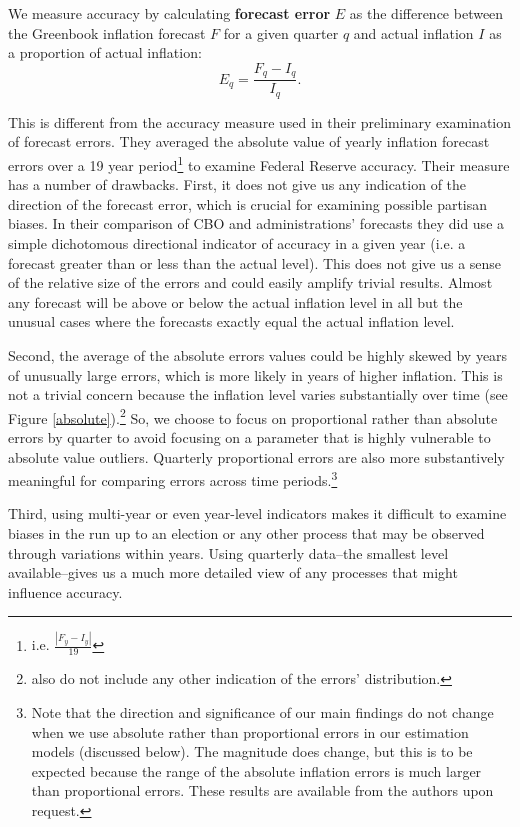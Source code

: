 \documentclass[a4paper]{article}
\begin{document}
We measure accuracy by calculating {\bf{forecast error}} $E$ as the difference between the Greenbook inflation forecast $F$ for a given quarter $q$ and actual inflation $I$ as a proportion of actual inflation:
%
\begin{equation}
    E_{q} = \frac{F_{q} - I_{q}}{I_{q}}.
\end{equation}

This is different from the accuracy measure \cite{Frendreis2000} used in their preliminary examination of forecast errors. They averaged the absolute value of yearly inflation forecast errors over a 19 year period\footnote{i.e. $\frac{|F_{y} - I_{y}|}{19}$} to examine Federal Reserve accuracy. Their measure has a number of drawbacks. First, it does not give us any indication of the direction of the forecast error, which is crucial for examining possible partisan biases. In their comparison of CBO and administrations' forecasts they did use a simple dichotomous directional indicator of accuracy in a given year (i.e. a forecast greater than or less than the actual level). This does not give us a sense of the relative size of the errors and could easily amplify trivial results. Almost any forecast will be above or below the actual inflation level in all but the unusual cases where the forecasts exactly equal the actual inflation level.

Second, the average of the absolute errors values could be highly skewed by years of unusually large errors, which is more likely in years of higher inflation. This is not a trivial concern because the inflation level varies substantially over time (see Figure \ref{absolute}).\footnote{\cite{Frendreis2000} also do not include any other indication of the errors' distribution.} So, we choose to focus on proportional rather than absolute errors by quarter to avoid focusing on a parameter that is highly vulnerable to absolute value outliers. Quarterly proportional errors are also more substantively meaningful for comparing errors across time periods.\footnote{Note that the direction and significance of our main findings do not change when we use absolute rather than proportional errors in our estimation models (discussed below). The magnitude does change, but this is to be expected because the range of the absolute inflation errors is much larger than proportional errors. These results are available from the authors upon request.}

Third, using multi-year or even year-level indicators makes it difficult to examine biases in the run up to an election or any other process that may be observed through variations within years. Using quarterly data--the smallest level available--gives us a much more detailed view of any processes that might influence accuracy.
\end{document}
